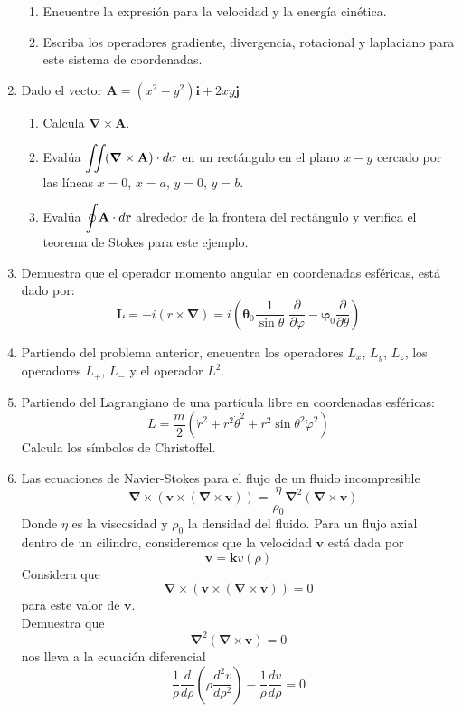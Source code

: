 \documentclass[12pt]{article}
\begin{document}
\begin{enumerate}
\begin{enumerate}
\item Encuentre la expresión para la velocidad y la energía cinética.
\item Escriba los operadores gradiente, divergencia, rotacional y laplaciano para este sistema de coordenadas.
\end{enumerate}
\item Dado el vector $\mathbf{A} = (x^{2} - y^{2}) \mathbf{i} +  2xy \mathbf{j}$
\begin{enumerate}
\item Calcula $\bm{\nabla} \times \mathbf{A}$.
\item Evalúa $\mathlarger{\iint} (\bm{\nabla} \times \mathbf{A}) \cdot d \sigma $ en un rectángulo en el plano $x-y$ cercado por las líneas $x=0$, $x=a$, $y=0$, $y=b$.
\item Evalúa $\mathlarger{\oint} \mathbf{A} \cdot d \mathbf{r}$ alrededor de la frontera del rectángulo y verifica el teorema de Stokes para este ejemplo.
\end{enumerate}
\item Demuestra que el operador momento angular en coordenadas esféricas, está dado por:
\[ \mathbf{L} = - i (r \times \bm{\nabla}) = i \left( \bm{\theta}_{0} \dfrac{1}{\sin \theta} \; \dfrac{\partial}{\partial \varphi} - \bm{\varphi}_{0} \dfrac{\partial}{\partial \theta} \right)  \]
\item Partiendo del problema anterior, encuentra los operadores $L_{x}$, $L_{y}$, $L_{z}$, los operadores $L_{+}$, $L_{-}$ y el operador $L^{2}$.
\item Partiendo del Lagrangiano de una partícula libre en coordenadas esféricas:
\[ L = \dfrac{m}{2} \left( \dot{r}^{2} + r^{2} \dot{\theta}^{2} + r^{2} \sin \theta^{2} \dot{\varphi}^{2} \right)\]
Calcula los símbolos de Christoffel.
\item Las ecuaciones de Navier-Stokes para el flujo de un fluido incompresible
\[ - \bm{\nabla} \times ( \mathbf{v} \times (\bm{\nabla} \times \mathbf{v} )) =  \dfrac{\eta}{\rho_{0}} \bm{\nabla}^{2} (\bm{\nabla} \times \mathbf{v}) \]
Donde $\eta$ es la viscosidad y $\rho_{0}$ la densidad del fluido. Para un flujo axial dentro de un cilindro, consideremos que la velocidad $\mathbf{v}$ está dada por
\[ \mathbf{v} =  \mathbf{k} v (\rho) \]
Considera que
\[ \bm{\nabla} \times (\mathbf{v} \times (\bm{\nabla} \times \mathbf{v})) = 0 \]
para este valor de $\mathbf{v}$.
\\
Demuestra que
\[ \bm{\nabla}^{2} ( \bm{\nabla} \times \mathbf{v}) = 0  \]
nos lleva a la ecuación diferencial
\[ \dfrac{1}{\rho} \dfrac{d}{d \rho} \left( \rho \dfrac{d^{2} v}{d \rho^{2}} \right) -  \dfrac{1}{\rho} \dfrac{d v}{d \rho} = 0 \]

\end{enumerate}
\end{document}
